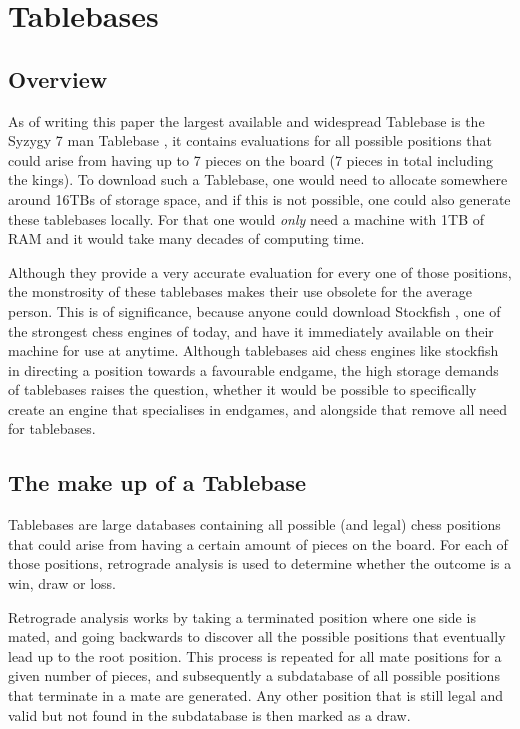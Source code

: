 \section{Tablebases}
\label{sec:Tablebases}

\subsection{Overview}
As of writing this paper the largest available and widespread Tablebase is the Syzygy 7 man Tablebase \cite{syzygy}, it contains evaluations for all possible positions that could arise from having up to 7 pieces on the board (7 pieces in total including the kings). To download such a Tablebase, one would need to allocate somewhere around 16TBs of storage space, and if this is not possible, one could also generate these tablebases locally. For that one would \textit{only} need a machine with 1TB of RAM and it would take many decades of computing time.

Although they provide a very accurate evaluation for every one of those positions, the monstrosity of these tablebases makes their use obsolete for the average person. This is of significance, because anyone could download Stockfish \cite{stockfish2024}, one of the strongest chess engines of today, and have it immediately available on their machine for use at anytime. Although tablebases aid chess engines like stockfish in directing a position towards a favourable endgame, the high storage demands of tablebases raises the question, whether it would be possible to specifically create an engine that specialises in endgames, and alongside that remove all need for tablebases.

\subsection{The make up of a Tablebase}
Tablebases are large databases containing all possible (and legal) chess positions that could arise from having a certain amount of pieces on the board. For each of those positions, retrograde analysis \cite{retroAnalysis} is used to determine whether the outcome is a win, draw or loss.

Retrograde analysis works by taking a terminated position where one side is mated, and going backwards to discover all the possible positions that eventually lead up to the root position. This process is repeated for all mate positions for a given number of pieces, and subsequently a subdatabase of all possible positions that terminate in a mate are generated. Any other position that is still legal and valid but not found in the subdatabase is then marked as a draw.

